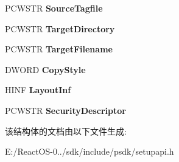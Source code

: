 \begin{DoxyCompactItemize}
\mbox{\label{struct___s_p___f_i_l_e___c_o_p_y___p_a_r_a_m_s___w_a671e98863dbdccd25078266906ef271e}} 
P\+C\+W\+S\+TR {\bfseries Source\+Tagfile}
\item 
\mbox{\label{struct___s_p___f_i_l_e___c_o_p_y___p_a_r_a_m_s___w_a145f647c108db8d009baeda1102c7286}} 
P\+C\+W\+S\+TR {\bfseries Target\+Directory}
\item 
\mbox{\label{struct___s_p___f_i_l_e___c_o_p_y___p_a_r_a_m_s___w_ab053150732c0369d1a35de786717610a}} 
P\+C\+W\+S\+TR {\bfseries Target\+Filename}
\item 
\mbox{\label{struct___s_p___f_i_l_e___c_o_p_y___p_a_r_a_m_s___w_af5834924317e2d221629211daf72674a}} 
D\+W\+O\+RD {\bfseries Copy\+Style}
\item 
\mbox{\label{struct___s_p___f_i_l_e___c_o_p_y___p_a_r_a_m_s___w_a2d33df1658a3d2b973f08f1f93da064a}} 
H\+I\+NF {\bfseries Layout\+Inf}
\item 
\mbox{\label{struct___s_p___f_i_l_e___c_o_p_y___p_a_r_a_m_s___w_ad9e5789539d41c2f5d19423616031cbf}} 
P\+C\+W\+S\+TR {\bfseries Security\+Descriptor}
\end{DoxyCompactItemize}


该结构体的文档由以下文件生成\+:\begin{DoxyCompactItemize}
\item 
E\+:/\+React\+O\+S-\/0../sdk/include/psdk/setupapi.\+h\end{DoxyCompactItemize}
